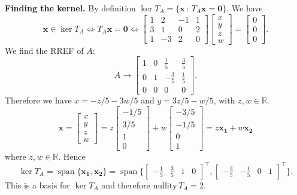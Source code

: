 \documentclass[12pt]{article}
\DeclareMathOperator{\Spn}{span}
\begin{document}
\textbf{Finding the kernel.} By definition $\ker T_A = \{ \mathbf{x} \, : \, T_A \mathbf{x} = \mathbf{0} \}$. We have
	\[
		\mathbf{x} \in \ker T_A \iff T_A \mathbf{x} = \mathbf{0} \iff \begin{bmatrix} 1 & 2 & -1 & 1\\3 & 1 & 0 & 2\\1 & -3 & 2 & 0 \end{bmatrix} \begin{bmatrix} x \\ y \\ z \\ w \end{bmatrix} = \begin{bmatrix} 0 \\ 0 \\ 0 \end{bmatrix} .
	\]
We find the RREF of $A$:
	\[
		A \rightarrow \begin{bmatrix} 1 & 0 & \frac{1}{5} & \frac{3}{5}\\0 & 1 & - \frac{3}{5} & \frac{1}{5}\\0 & 0 & 0 & 0 \end{bmatrix} .
	\]
Therefore we have $x = -z/5 - 3w/5$ and $y = 3z/5 - w/5$, with $z, w \in \mathbb{R}$.
	\[
		\mathbf{x} = \begin{bmatrix} x \\ y \\ z \\ w \end{bmatrix} = z \begin{bmatrix} -1/5 \\ 3/5 \\ 1 \\ 0 \end{bmatrix} + w \begin{bmatrix} -3/5 \\ -1/5 \\ 0 \\ 1 \end{bmatrix} = z \mathbf{x_1} + w \mathbf{x_2}
	\]
where $z, w \in \mathbb{R}$. Hence
	\[
		\ker T_A = \Spn \{ \mathbf{x_1} , \mathbf{x_2} \} = \Spn \Big\{ \begin{bmatrix} -\frac{1}{5} & \frac{3}{5} & 1 & 0 \end{bmatrix}^\top , \begin{bmatrix} -\frac{3}{5} & - \frac{1}{5} & 0 & 1 \end{bmatrix}^\top \Big\} .
	\]
This is a basis for $\ker T_A$ and therefore $\mathrm{nullity}\, T_A = 2$. 
\vspace*{10pt}
\end{document}
